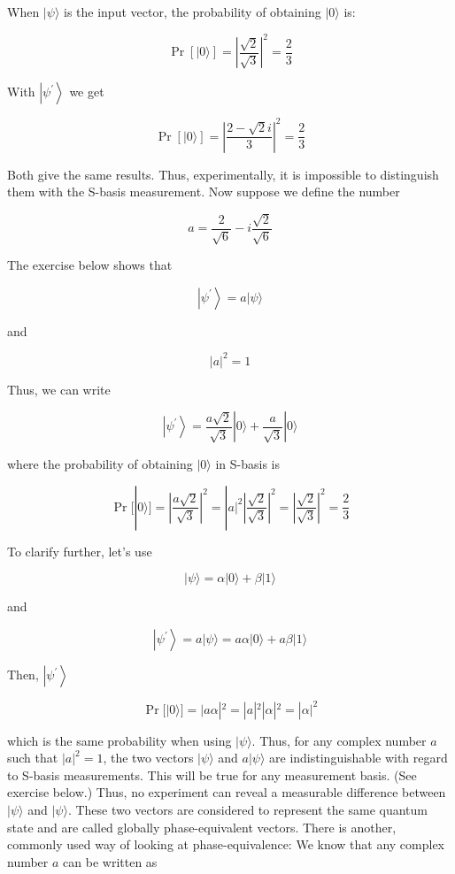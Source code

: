 \documentclass[main.tex]{subfiles}
\begin{document}
    When $|\psi\rangle$ is the input vector, the probability of obtaining $|0\rangle$ is:
    
    $$
    \operatorname{Pr}[|0\rangle]=\left|\frac{\sqrt{2}}{\sqrt{3}}\right|^{2}=\frac{2}{3}
    $$
    
    With $\left|\psi^{\prime}\right\rangle$ we get
    
    $$
    \operatorname{Pr}[|0\rangle]=\left|\frac{2-\sqrt{2} i}{3}\right|^{2}=\frac{2}{3}
    $$
    
    Both give the same results. Thus, experimentally, it is impossible to distinguish them with the S-basis measurement. Now suppose we define the number
    
    $$
    a=\frac{2}{\sqrt{6}}-i \frac{\sqrt{2}}{\sqrt{6}}
    $$
    
    The exercise below shows that
    
    $$
    \left|\psi^{\prime}\right\rangle=a|\psi\rangle
    $$
    
    and
    
    $$
    |a|^{2}=1
    $$
    
    Thus, we can write
    
    $$
    \left|\psi^{\prime}\right\rangle=\frac{a \sqrt{2}}{\sqrt{3}}|0\rangle+\frac{a}{\sqrt{3}}|0\rangle
    $$
    
    where the probability of obtaining $|0\rangle$ in S-basis is
    
    $$
    \operatorname{Pr}[|0\rangle]=\left|\frac{a \sqrt{2}}{\sqrt{3}}\right|^{2}=|a|^{2}\left|\frac{\sqrt{2}}{\sqrt{3}}\right|^{2}=\left|\frac{\sqrt{2}}{\sqrt{3}}\right|^{2}=\frac{2}{3}
    $$
    
    To clarify further, let's use
    
    $$
    |\psi\rangle=\alpha|0\rangle+\beta|1\rangle
    $$
    
    and
    
    $$
    \left|\psi^{\prime}\right\rangle=a|\psi\rangle=a \alpha|0\rangle+a \beta|1\rangle
    $$
    
    Then, $\left|\psi^{\prime}\right\rangle$
    
    $$
    \operatorname{Pr}[|0\rangle]=|a \alpha|^{2}=|a|^{2}|\alpha|^{2}=|\alpha|^{2}
    $$
    
    which is the same probability when using $|\psi\rangle$. Thus, for any complex number $a$ such that $|a|^{2}=1$, the two vectors $|\psi\rangle$ and $a|\psi\rangle$ are indistinguishable with regard to S-basis measurements. This will be true for any measurement basis. (See exercise below.) Thus, no experiment can reveal a measurable difference between $|\psi\rangle$ and $|\psi\rangle$. These two vectors are considered to represent the same quantum state and are called globally phase-equivalent vectors. There is another, commonly used way of looking at phase-equivalence: We know that any complex number $a$ can be written as
    
\end{document}
